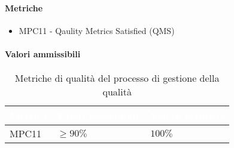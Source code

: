 \paragraph{Metriche}
\begin{itemize}
	\item MPC11 - Qaulity Metrics Satisfied (QMS)
\end{itemize}

\paragraph{Valori ammissibili}
{
\renewcommand{\arraystretch}{1.5}
\centering
\begin{longtable}{C{2.5cm} C{4cm} C{4cm}}
\textcolor{white}{\textbf{Metrica}}&
\textcolor{white}{\textbf{Valori accettabile}}&
\textcolor{white}{\textbf{Valore ottimale}}\\	
\endhead
\endfoot
{}\caption{Metriche di qualità del processo di gestione della qualità}
\endlastfoot

MPC11 & $\geq 90\% $  & $ 100 \% $ \\

\end{longtable}
}

